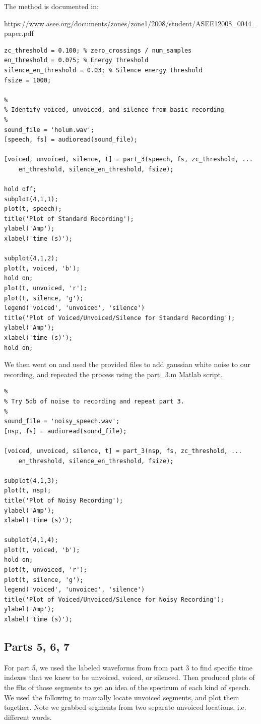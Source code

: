 \documentclass[11pt]{article}
\begin{document}
The method is documented in: 

https://www.asee.org/documents/zones/zone1/2008/student/ASEE12008\_0044\_paper.pdf

\begin{lstlisting}
zc_threshold = 0.100; % zero_crossings / num_samples
en_threshold = 0.075; % Energy threshold
silence_en_threshold = 0.03; % Silence energy threshold
fsize = 1000;

%
% Identify voiced, unvoiced, and silence from basic recording
%
sound_file = 'holum.wav';
[speech, fs] = audioread(sound_file);

[voiced, unvoiced, silence, t] = part_3(speech, fs, zc_threshold, ...
    en_threshold, silence_en_threshold, fsize);

hold off;
subplot(4,1,1);
plot(t, speech);
title('Plot of Standard Recording');
ylabel('Amp');
xlabel('time (s)');

subplot(4,1,2);
plot(t, voiced, 'b');
hold on;
plot(t, unvoiced, 'r');
plot(t, silence, 'g');
legend('voiced', 'unvoiced', 'silence')
title('Plot of Voiced/Unvoiced/Silence for Standard Recording');
ylabel('Amp');
xlabel('time (s)');
hold on;
\end{lstlisting}

% 
%
We then went on and used the provided files to add gaussian white noise to our recording, and repeated the process using the part\_3.m Matlab script.

\begin{lstlisting}
%
% Try 5db of noise to recording and repeat part 3.
%
sound_file = 'noisy_speech.wav';
[nsp, fs] = audioread(sound_file);

[voiced, unvoiced, silence, t] = part_3(nsp, fs, zc_threshold, ...
    en_threshold, silence_en_threshold, fsize);

subplot(4,1,3);
plot(t, nsp);
title('Plot of Noisy Recording');
ylabel('Amp');
xlabel('time (s)');

subplot(4,1,4);
plot(t, voiced, 'b');
hold on;
plot(t, unvoiced, 'r');
plot(t, silence, 'g');
legend('voiced', 'unvoiced', 'silence')
title('Plot of Voiced/Unvoiced/Silence for Noisy Recording');
ylabel('Amp');
xlabel('time (s)');
\end{lstlisting}


\subsection{Parts 5, 6, 7}

For part 5, we used the labeled waveforms from from part 3 to find specific time indexes that we knew to be unvoiced, voiced, or silenced. Then produced plots of the ffts of those segments to get an idea of the spectrum of each kind of speech. We used the following to manually locate unvoiced segments, and plot them together. Note we grabbed segments from two separate unvoiced locations, i.e. different words.
\end{document}
